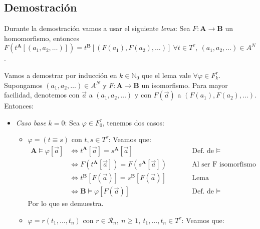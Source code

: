 \documentclass{article}
\begin{document}
\subsection*{Demostración}
Durante la demostración vamos a usar el siguiente \textit{lema}: Sea $F:\mathbf{A}\to\mathbf{B}$ un homomorfismo, entonces $F(t^\mathbf{A}[(a_1,a_2,\dots)])=t^\mathbf{B}[(F(a_1),F(a_2),\dots)]\ \forall t\in T^\tau,\ (a_1,a_2,\dots)\in A^N$.

\vspace{0.4cm}
Vamos a demostrar por inducción en $k\in\mathbb{N}_0$ que el lema vale $\forall\varphi\in F^\tau_k$. Supongamos $(a_1,a_2,\dots)\in A^N$ y $F:\mathbf{A}\to\mathbf{B}$ un isomorfismo. Para mayor facilidad, denotemos con $\vec{a}$ a $(a_1,a_2,\dots)$ y con $F(\vec{a})$ a $(F(a_1),F(a_2),\dots)$. Entonces:
\begin{itemize}
  \item \textit{Caso base} $k=0$: Sea $\varphi\in F^\tau_0$, tenemos dos casos:
        \begin{itemize}
          \item $\varphi=(t\equiv s)$ con $t,s\in T^\tau$: Veamos que:
                \begin{equation*}
                  \begin{alignedat}{2}
                    \mathbf{A}\vDash\varphi[\vec{a}] & \iff t^\mathbf{A}[\vec{a}]=s^\mathbf{A}[\vec{a}]       &  & \qquad\text{Def. de }\vDash                         \\
                                                     & \iff F(t^\mathbf{A}[\vec{a}])=F(s^\mathbf{A}[\vec{a}]) &  & \qquad\text{Al ser F isomorfismo (i.e., biyectiva)} \\
                                                     & \iff t^\mathbf{B}[F(\vec{a})]=s^\mathbf{B}[F(\vec{a})] &  & \qquad\text{Lema}                                   \\
                                                     & \iff\mathbf{B}\vDash\varphi[F(\vec{a})]                &  & \qquad\text{Def. de }\vDash
                  \end{alignedat}
                \end{equation*}
                Por lo que se demuestra.
          \item $\varphi=r(t_1,\dots,t_n)$ con $r\in\mathcal{R}_n,\ n\geq 1,\ t_1,\dots,t_n\in T^\tau$: Veamos que:
                \begin{equation*}
                  \begin{alignedat}{2}

\end{alignedat}
\end{equation*}
\end{itemize}
\end{itemize}
\end{document}
